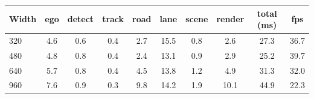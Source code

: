 \begin{tabular}{@{}lccccccccc@{}}
\toprule
Width & ego & detect & track & road & lane & scene & render & total (ms) & fps \\
\midrule
320 & 4.6 & 0.6 & 0.4 & 2.7 & 15.5 & 0.8 & 2.6 & 27.3 & 36.7 \\
480 & 4.8 & 0.8 & 0.4 & 2.4 & 13.1 & 0.9 & 2.9 & 25.2 & 39.7 \\
640 & 5.7 & 0.8 & 0.4 & 4.5 & 13.8 & 1.2 & 4.9 & 31.3 & 32.0 \\
960 & 7.6 & 0.9 & 0.3 & 9.8 & 14.2 & 1.9 & 10.1 & 44.9 & 22.3 \\
\bottomrule
\end{tabular}
